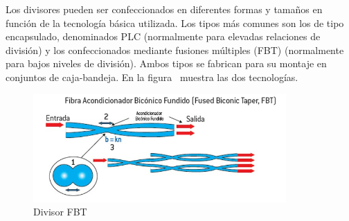 \vfill

\clearpage


Los divisores pueden ser confeccionados en diferentes formas y tamaños en función de la tecnología básica utilizada. Los tipos más comunes son los de tipo encapsulado, denominados PLC (normalmente para elevadas relaciones de división) y los confeccionados mediante fusiones múltiples (FBT) (normalmente para bajos niveles de división). Ambos tipos se fabrican para su montaje en conjuntos de caja-bandeja. En la figura~ muestra las dos tecnologías.



\begin{figure}[H]
	\centering
	\includegraphics[width=0.86\textwidth]{./img/punto5/Divisor-FBT.jpg}
	\caption{Divisor FBT}
	\label{fig:FBT_splitter}
\end{figure}



